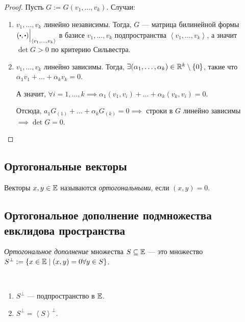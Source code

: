 \begin{proof}
    Пусть $G := G(v_1, \dots, v_k)$.
    Случаи:
    \begin{enumerate}
    \item $v_1, \dots, v_k$ линейно независимы. Тогда, $G$ --- матрица билинейной формы $(\bigcdot, \bigcdot) \Big|_{\left< v_1, \dots, v_k \right>}$ в базисе $v_1, \dots, v_k$ подпространства $\left< v_1, \dots, v_k \right>$, а значит $\det G > 0$ по критерию Сильвестра.
    
    \item $v_1, \dots, v_k$ линейно зависимы. Тогда, $\exists (\alpha_1, \dots, \alpha_k) \in \mathbb{R}^k \setminus \{0\}$, такие что $\alpha_1 v_1 + \dots + \alpha_k v_k = 0$.

        А значит,  $\forall i = 1, \dots, k \implies \alpha_1 (v_1, v_i) + \dots + \alpha_k (v_k, v_i) = 0$.
        
        Отсюда, $a_1 G_{(1)} + \dots + \alpha_k G_{(k)} = 0 \implies$ строки в $G$ линейно зависимы $\implies \det G = 0$.
        \qedhere
    \end{enumerate}
\end{proof}


\subsection{Ортогональные векторы}

\begin{definition}
    Векторы $x, y \in \mathbb{E}$ называются \textit{ортогональными}, если $(x, y) = 0$.
\end{definition}


\subsection{Ортогональное дополнение подмножества евклидова пространства}

\begin{definition}
    \textit{Ортогональное дополнение} множества $S \subseteq \mathbb{E}$ --- это множество $S^{\perp} := \{x \in \mathbb{E} \mid (x, y) = 0 \forall y \in S\}$.
\end{definition}

\begin{exercise}~
    \begin{enumerate}
    \item $S^{\perp}$ --- подпространство в $\mathbb{E}$.
    \item $S^{\perp} = \left< S \right>^{\perp}$.
    \end{enumerate}
\end{exercise}

